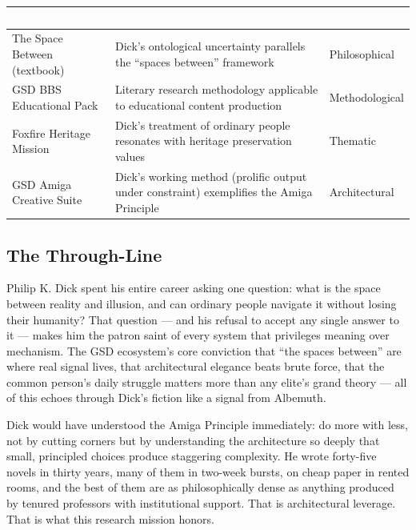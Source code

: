 \documentclass[11pt,letterpaper]{article}
\newcommand{\tableheader}[1]{\textbf{\sffamily\textcolor{white}{#1}}}
\begin{document}
\begin{center}
\begin{tabularx}{\textwidth}{L{4cm}XC{2.5cm}}
\toprule
{}
\tableheader{Document} & \tableheader{Relationship} & \tableheader{Type} \\
\midrule
The Space Between (textbook) & Dick's ontological uncertainty parallels the ``spaces between'' framework & Philosophical \\
GSD BBS Educational Pack & Literary research methodology applicable to educational content production & Methodological \\
Foxfire Heritage Mission & Dick's treatment of ordinary people resonates with heritage preservation values & Thematic \\
GSD Amiga Creative Suite & Dick's working method (prolific output under constraint) exemplifies the Amiga Principle & Architectural \\
\bottomrule
\end{tabularx}
\end{center}

\subsection{The Through-Line}

Philip K. Dick spent his entire career asking one question: what is the space between reality and illusion, and can ordinary people navigate it without losing their humanity? That question --- and his refusal to accept any single answer to it --- makes him the patron saint of every system that privileges meaning over mechanism. The GSD ecosystem's core conviction that ``the spaces between'' are where real signal lives, that architectural elegance beats brute force, that the common person's daily struggle matters more than any elite's grand theory --- all of this echoes through Dick's fiction like a signal from Albemuth.

Dick would have understood the Amiga Principle immediately: do more with less, not by cutting corners but by understanding the architecture so deeply that small, principled choices produce staggering complexity. He wrote forty-five novels in thirty years, many of them in two-week bursts, on cheap paper in rented rooms, and the best of them are as philosophically dense as anything produced by tenured professors with institutional support. That is architectural leverage. That is what this research mission honors.
\end{document}
